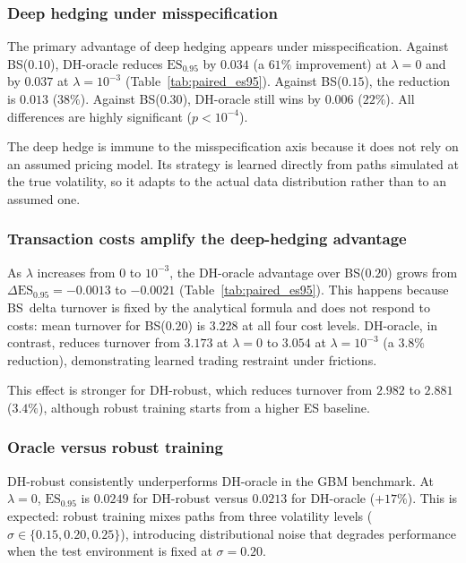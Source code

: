 \documentclass[12pt,a4paper]{article}
\theoremstyle{definition}
\theoremstyle{plain}
\theoremstyle{remark}
\theoremstyle{plain}
\begin{document}
\subsubsection*{Deep hedging under misspecification}
 
The primary advantage of deep hedging appears under
misspecification.
Against BS($0.10$), DH-oracle reduces $\mathrm{ES}_{0.95}$
by $0.034$ (a $61\%$ improvement) at $\lambda = 0$ and by $0.037$
at $\lambda = 10^{-3}$
(Table~\ref{tab:paired_es95}).
Against BS($0.15$), the reduction is $0.013$ ($38\%$).
Against BS($0.30$), DH-oracle still wins by $0.006$ ($22\%$).
All differences are highly significant ($p < 10^{-4}$).
 
The deep hedge is immune to the misspecification axis because
it does not rely on an assumed pricing model.
Its strategy is learned directly from paths simulated
at the true volatility, so it adapts to the actual data distribution
rather than to an assumed one.
 
\subsubsection*{Transaction costs amplify the deep-hedging advantage}
 
As $\lambda$ increases from $0$ to $10^{-3}$,
the DH-oracle advantage over BS($0.20$) grows from
$\Delta\mathrm{ES}_{0.95} = -0.0013$ to $-0.0021$
(Table~\ref{tab:paired_es95}).
This happens because BS~delta turnover is fixed by the analytical
formula and does not respond to costs:
mean turnover for BS($0.20$) is $3.228$ at all four cost levels.
DH-oracle, in contrast, reduces turnover from $3.173$ at $\lambda = 0$
to $3.054$ at $\lambda = 10^{-3}$ (a $3.8\%$ reduction),
demonstrating learned trading restraint under frictions.
 
This effect is stronger for DH-robust, which reduces turnover
from $2.982$ to $2.881$ ($3.4\%$), although robust training starts
from a higher ES baseline.
 
\subsubsection*{Oracle versus robust training}
 
DH-robust consistently underperforms DH-oracle in the GBM benchmark.
At $\lambda = 0$, $\mathrm{ES}_{0.95}$ is $0.0249$ for DH-robust
versus $0.0213$ for DH-oracle ($+17\%$).
This is expected: robust training mixes paths from three volatility
levels ($\sigma \in \{0.15, 0.20, 0.25\}$), introducing distributional
noise that degrades performance when the test environment is
fixed at $\sigma = 0.20$.
 
\end{document}
